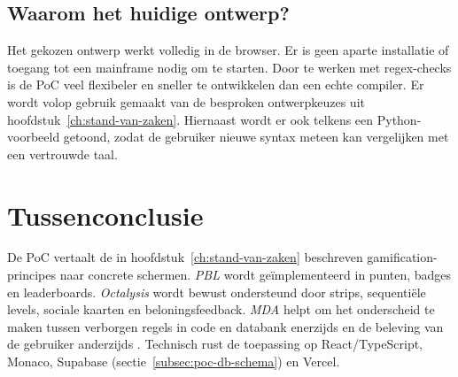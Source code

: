 \subsection{Waarom het huidige ontwerp?}
Het gekozen ontwerp werkt volledig in de browser. Er is geen aparte installatie of toegang tot een mainframe nodig om te starten.
Door te werken met regex-checks is de PoC veel flexibeler en sneller te ontwikkelen dan een echte compiler.
Er wordt volop gebruik gemaakt van de besproken ontwerpkeuzes uit hoofdstuk~\ref{ch:stand-van-zaken}. 
Hiernaast wordt er ook telkens een Python-voorbeeld getoond, zodat de gebruiker nieuwe syntax meteen kan vergelijken met een vertrouwde taal. 

\section{Tussenconclusie}

De PoC vertaalt de in hoofdstuk~\ref{ch:stand-van-zaken} beschreven gamification-principes naar concrete schermen. \textit{PBL} wordt geïmplementeerd in punten, badges en leaderboards. \textit{Octalysis} wordt bewust ondersteund door strips, sequentiële levels, sociale kaarten en beloningsfeedback. \textit{MDA} helpt om het onderscheid te maken tussen verborgen regels in code en databank enerzijds en de beleving van de gebruiker anderzijds \autocite{Hunicke2004}.
Technisch rust de toepassing op React/TypeScript, Monaco, Supabase (sectie~\ref{subsec:poc-db-schema}) en Vercel.